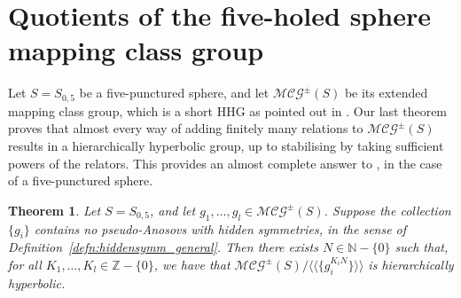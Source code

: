 \documentclass[svgnames]{amsart}
\theoremstyle{plain}
\newtheorem{thm}{Theorem}[section]
\theoremstyle{definition}
\newcommand{\MCG}{\mathcal{MCG}^\pm}
\begin{document}
\section{Quotients of the five-holed sphere mapping class group}\label{sec:mcg_quot}
Let $S=S_{0,5}$ be a five-punctured sphere, and let $\MCG(S)$ be its extended mapping class group, which is a short HHG as pointed out in \cite[Subsection 2.3.1]{Short_HHG:I}. Our last theorem proves that almost every way of adding finitely many relations to $\MCG(S)$ results in a hierarchically hyperbolic group, up to stabilising by taking sufficient powers of the relators. This provides an almost complete answer to \cite[Question 3]{rigidity_mcg_mod_dt}, in the case of a five-punctured sphere. 




\begin{thm}\label{thm:S5_quotient}
    Let $S=S_{0,5}$, and let $g_1,\dots,g_l\in \MCG(S)$. 
    Suppose the collection $\{g_i\}$ contains no pseudo-Anosovs with hidden symmetries, in the sense of Definition~\ref{defn:hiddensymm_general}. Then there exists $N\in\mathbb{N}-\{0\}$ such that, for all $K_1,\dots, K_l\in \mathbb{Z}-\{0\}$, we have that $\MCG(S)/\langle\langle \{g_i^{K_i N}\}\rangle\rangle$ is hierarchically hyperbolic.
\end{thm}
\end{document}
